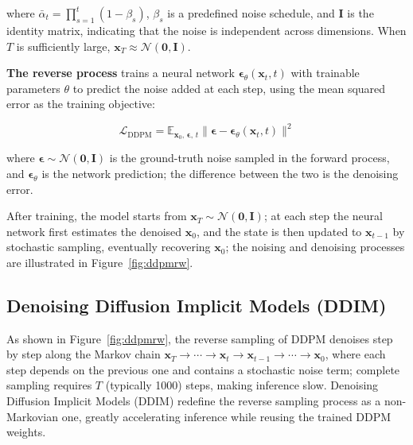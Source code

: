 where $\bar{\alpha}_t = \prod_{s=1}^{t}(1 - \beta_s)$,
$\beta_s$ is a predefined noise schedule,
and $\mathbf{I}$ is the identity matrix, indicating that the noise is independent across dimensions.
When $T$ is sufficiently large, $\mathbf{x}_T \approx \mathcal{N}(\mathbf{0}, \mathbf{I})$.

\textbf{The reverse process} trains a neural network
$\boldsymbol{\epsilon}_\theta(\mathbf{x}_t, t)$ with trainable parameters $\theta$
to predict the noise added at each step,
using the mean squared error as the training objective:

\begin{equation}
  \mathcal{L}_{\mathrm{DDPM}} =
    \mathbb{E}_{\mathbf{x}_0,\,\boldsymbol{\epsilon},\,t}
    \bigl\|\boldsymbol{\epsilon} - \boldsymbol{\epsilon}_\theta(\mathbf{x}_t, t)\bigr\|^2
\end{equation}

where $\boldsymbol{\epsilon} \sim \mathcal{N}(\mathbf{0}, \mathbf{I})$
is the ground-truth noise sampled in the forward process, and $\boldsymbol{\epsilon}_\theta$ is the network prediction;
the difference between the two is the denoising error.

After training, the model starts from $\mathbf{x}_T \sim \mathcal{N}(\mathbf{0}, \mathbf{I})$;
at each step the neural network first estimates the denoised $\hat{\mathbf{x}}_0$,
and the state is then updated to $\mathbf{x}_{t-1}$ by stochastic sampling,
eventually recovering $\mathbf{x}_0$; the noising and denoising processes are illustrated in Figure~\ref{fig:ddpmrw}.

\subsection{Denoising Diffusion Implicit Models (DDIM)}

As shown in Figure~\ref{fig:ddpmrw}, the reverse sampling of DDPM denoises step by step along the Markov chain
$\mathbf{x}_T \to \cdots \to \mathbf{x}_t \to \mathbf{x}_{t-1} \to \cdots \to \mathbf{x}_0$,
where each step depends on the previous one and contains a stochastic noise term;
complete sampling requires $T$ (typically 1000) steps, making inference slow.
Denoising Diffusion Implicit Models (DDIM) \cite{ddim}
redefine the reverse sampling process as a non-Markovian one,
greatly accelerating inference while reusing the trained DDPM weights.


